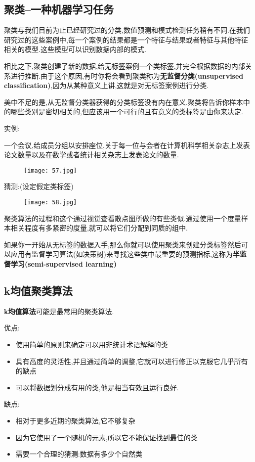 \documentclass[11pt,a4paper,oneside]{book}
\begin{document}
\subsection{聚类--一种机器学习任务}
聚类与我们目前为止已经研究过的分类,数值预测和模式检测任务稍有不同.在我们研究过的这些案例中,每一个案例的结果都是一个特征与结果或者特征与其他特征相关的模型.这些模型可以识别数据内部的模式.

相比之下,聚类创建了新的数据,给无标签案例一个类标签,并完全根据数据的内部关系进行推断.由于这个原因,有时你将会看到聚类称为\textbf{无监督分类(unsupervised classification)},因为从某种意义上讲,这就是对无标签案例进行分类.

美中不足的是,从无监督分类器获得的分类标签没有内在意义.聚类将告诉你样本中的哪些类别是密切相关的,但应该用一个可行的且有意义的类标签是由你来决定.

实例:

一个会议,给成员分组以安排座位,关于每一位与会者在计算机科学相关杂志上发表论文数量以及在数学或者统计相关杂志上发表论文的数量.
\begin{figure}[H]
	\centering
	\texttt{[image: 57.jpg]}
\end{figure}
猜测:(设定假定类标签)
\begin{figure}[H]
	\centering
	\texttt{[image: 58.jpg]}
\end{figure}

聚类算法的过程和这个通过视觉查看散点图所做的有些类似.通过使用一个度量样本相关程度有多紧密的度量,就可以将它们分配到同质的组中.

\begin{tcolorbox}[colback=blue!7!white,colframe=blue!40]
如果你一开始从无标签的数据入手,那么你就可以使用聚类来创建分类标签然后可以应用有监督学习算法(如决策树)来寻找这些类中最重要的预测指标,这称为\textbf{半监督学习(semi-supervised learning)}
\end{tcolorbox}

\subsection{k均值聚类算法}
\textbf{k均值算法}可能是最常用的聚类算法.
\begin{tcolorbox}[colback=pink!10!white,colframe=pink!100!black]
优点:
\begin{itemize}
	\item 使用简单的原则来确定可以用非统计术语解释的类
	\item 具有高度的灵活性,并且通过简单的调整,它就可以进行修正以克服它几乎所有的缺点
	\item 可以将数据划分成有用的类,他是相当有效且运行良好.
\end{itemize}
缺点:
\begin{itemize}
	\item 相对于更多近期的聚类算法,它不够复杂
	\item 因为它使用了一个随机的元素,所以它不能保证找到最佳的类
	\item 需要一个合理的猜测:数据有多少个自然类
\end{itemize}
\end{tcolorbox}
\end{document}
